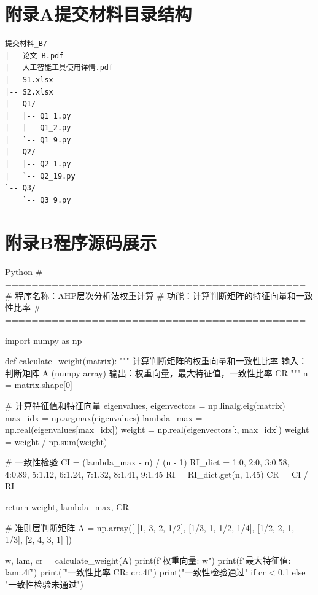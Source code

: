 \documentclass[12pt]{article}
\begin{document}
\section*{附录A\quad 提交材料目录结构}
\begin{treebox}
\begin{verbatim}
提交材料_B/
|-- 论文_B.pdf
|-- 人工智能工具使用详情.pdf
|-- S1.xlsx
|-- S2.xlsx
|-- Q1/
|   |-- Q1_1.py
|   |-- Q1_2.py
|   `-- Q1_9.py
|-- Q2/
|   |-- Q2_1.py
|   `-- Q2_19.py
`-- Q3/
    `-- Q3_9.py
\end{verbatim}
\end{treebox}


\section*{附录B\quad 程序源码展示}
\begin{mycode}{Python}
# =============================================
# 程序名称：AHP层次分析法权重计算
# 功能：计算判断矩阵的特征向量和一致性比率
# =============================================

import numpy as np

def calculate_weight(matrix):
    """
    计算判断矩阵的权重向量和一致性比率
    输入：判断矩阵 A (numpy array)
    输出：权重向量，最大特征值，一致性比率 CR
    """
    n = matrix.shape[0]
    
    # 计算特征值和特征向量
    eigenvalues, eigenvectors = np.linalg.eig(matrix)
    max_idx = np.argmax(eigenvalues)
    lambda_max = np.real(eigenvalues[max_idx])
    weight = np.real(eigenvectors[:, max_idx])
    weight = weight / np.sum(weight)
    
    # 一致性检验
    CI = (lambda_max - n) / (n - 1)
    RI_dict = {1:0, 2:0, 3:0.58, 4:0.89, 5:1.12, 
                6:1.24, 7:1.32, 8:1.41, 9:1.45}
    RI = RI_dict.get(n, 1.45)
    CR = CI / RI
    
    return weight, lambda_max, CR

# 准则层判断矩阵
A = np.array([
    [1, 3, 2, 1/2],
    [1/3, 1, 1/2, 1/4],
    [1/2, 2, 1, 1/3],
    [2, 4, 3, 1]
])

w, lam, cr = calculate_weight(A)
print(f"权重向量: {w}")
print(f"最大特征值: {lam:.4f}")
print(f"一致性比率 CR: {cr:.4f}")
print("一致性检验通过" if cr < 0.1 else "一致性检验未通过")
\end{mycode}
\end{document}
